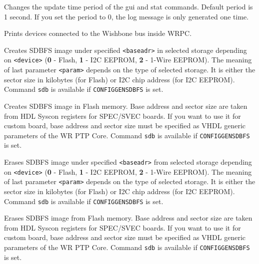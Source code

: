 \documentclass[a4paper, 12pt]{article}
\renewcommand{\_}{\underscore\allowbreak}
\newcommand{\code}[1]{\texttt{#1}}
\begin{document}
\begin{description}
  Changes the update time period of the gui and stat commands.
  Default period is 1 second. If you set the period to 0, the log
  message is only generated one time.

\item[sdb] \mbox{}

  Prints devices connected to the Wishbone bus inside WRPC.

\item[sdb fs <device> <baseadr> <param>] \mbox{}

  \hypertarget{cmd sdb fs}{} Creates SDBFS image under specified
  \code{<baseadr>} in selected storage depending on \code{<device>}
  ({\bf 0} - Flash, {\bf 1} - I2C EEPROM, {\bf 2} - 1-Wire
  EEPROM). The meaning of last parameter \code{<param>} depends on the
  type of selected storage. It is either the sector size in kilobytes
  (for Flash) or I2C chip address (for I2C EEPROM). Command \code{sdb}
  is available if \texttt{CONFIG\_GENSDBFS} is set.

\item[sdb fs 0] \mbox{}

  Creates SDBFS image in Flash memory. Base address and sector size
  are taken from HDL Syscon registers for SPEC/SVEC boards. If you
  want to use it for custom board, base address and sector size must
  be specified as VHDL generic parameters of the WR PTP Core. Command
  \code{sdb} is available if \texttt{CONFIG\_GENSDBFS} is set.

\item[sdb fse <device> <baseadr> <param>] \mbox{}

  \hypertarget{cmd sdb fse}{} Erases SDBFS image under specified
  \code{<baseadr>} from selected storage depending on \code{<device>}
  ({\bf 0} - Flash, {\bf 1} - I2C EEPROM, {\bf 2} - 1-Wire
  EEPROM). The meaning of last parameter \code{<param>} depends on the
  type of selected storage. It is either the sector size in kilobytes
  (for Flash) or I2C chip address (for I2C EEPROM). Command \code{sdb}
  is available if \texttt{CONFIG\_GENSDBFS} is set.

\item[sdb fse 0] \mbox{}

  Erases SDBFS image from Flash memory. Base address and sector size
  are taken from HDL Syscon registers for SPEC/SVEC boards. If you
  want to use it for custom board, base address and sector size must
  be specified as VHDL generic parameters of the WR PTP Core. Command
  \code{sdb} is available if \texttt{CONFIG\_GENSDBFS} is set.


\end{description}
\end{document}
